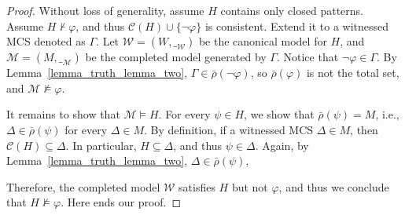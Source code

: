 \documentclass[acmsmall]{acmart}
\theoremstyle{acmdefinition}
\newcommand{\MM}{\mathcal{M}}
\newcommand{\WW}{\mathcal{W}}
\newcommand{\interp}[1]{\__{#1}}
\newcommand{\interpM}{\interp{\MM}}
\newcommand{\interpW}{\interp{\WW}}
\newcommand{\barrho}{\bar{\rho}}
\newcommand{\CC}{\mathcal{C}}
\begin{document}
\completenessB*
\begin{proof}
Without loss of generality, assume $H$ contains only closed patterns.
Assume $H \not\vdash \varphi$,
and thus $\CC(H)  \cup \{ \neg \varphi \}$ is consistent.
Extend it to a witnessed MCS denoted as $\Gamma$.
Let $\WW = (W, \interpW)$ be the canonical model for $H$,
and $\MM = (M,\interpM)$ be the completed model generated by $\Gamma$.
Notice that $\neg \varphi \in \Gamma$.
By Lemma~\ref{lemma_truth_lemma_two},
$\Gamma \in \barrho(\neg \varphi)$,
so $\barrho(\varphi)$ is not the total set,
and $\MM \not\vDash \varphi$.

It remains to show that $\MM \vDash H$.
For every $\psi \in H$, we show that $\barrho(\psi) = M$, i.e.,
$\Delta \in \barrho(\psi)$ for every $\Delta \in M$.
By definition, if a witnessed MCS $\Delta \in M$,
then $\CC(H) \subseteq \Delta$.
In particular, $H \subseteq \Delta$, and thus $\psi \in \Delta$.
Again, by Lemma~\ref{lemma_truth_lemma_two}, 
$\Delta \in \barrho(\psi)$,

Therefore, the completed model $\WW$ satisfies $H$ but not $\varphi$,
and thus we conclude that $H \not\vDash \varphi$.
Here ends our proof.
\end{proof}





\end{document}
